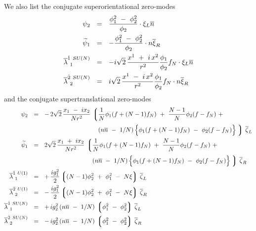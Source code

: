 \documentclass{article}
\newcommand{\wt}{\widetilde}
\newcommand{\ov}{\overline}
\newcommand{\lgr}{\left\lgroup}
\newcommand{\rgr}{\right\rgroup}
\newcommand{\nbar}{\ov{n}}
\begin{document}
We also list the conjugate superorientational zero-modes
\begin{align}
\label{n2_sorient_conj}
%
\notag
{\psi}_{2} & ~~=~~ \frac{\phi_1^2 ~-~ \phi_2^2}{\phi_2} \cdot \xi_L \nbar   \\
%
\notag
\wt{\psi}_{1}  & ~~=~~ - \frac{\phi_1^2 ~-~ \phi_2^2}{\phi_2} \cdot n \ov{\xi}_R  \\
%
\ov{\lambda}^{\dot{1}\ SU(N)}_{\ 1} & ~~=~~ - i \sqrt{2}\, \frac{ x^1 ~+~ i\, x^2 }{r^2} \frac{\phi_1}{\phi_2} f_N \cdot \xi_L \nbar \\
%
\notag
\ov{\lambda}^{\dot{2}\ SU(N)}_{\ 2} & ~~=~~  i \sqrt{2}\, \frac{ x^1 ~-~ i\, x^2 }{r^2} \frac{\phi_1}{\phi_2} f_N \cdot n \ov{\xi}_R 
\end{align}
	and the conjugate supertranslational zero-modes
\begin{align*}
%
\psi_{2}	& ~~=~~  -\,  2\sqrt{2}\, \frac{x_1 ~-~ i x_2}{N r^2} \,
		\lgr \frac{1}{N} \phi_1 ( f + (N-1) f_N ) ~+~ \frac{N-1}{N} \phi_2 ( f - f_N ) ~+~ \right.
		\\
%
			& \phantom{~~=~~  -\,  2\sqrt{2}\, \frac{x_1 ~-~ i x_2}{N r^2} \,\lgr \right.}
			\left( n\nbar ~-~ 1/N \right )
			\Bigl\{ \phi_1 ( f + ( N-1 ) f_N ) ~-~ \phi_2 ( f - f_N) \Bigr\}
		\left. \rgr\, \ov{\zeta}_L
		\\
%
\wt{\psi}_{1} & ~~=~~    2\sqrt{2} \, \frac{x_1 ~+~ i x_2}{N r^2} \,
		\lgr \frac{1}{N} \phi_1 ( f + (N-1) f_N ) ~+~ \frac{N-1}{N} \phi_2 ( f - f_N ) ~+~ \right.
		\\
%
			& \phantom{~~=~~    2\sqrt{2} \, \frac{x_1 ~+~ i x_2}{N r^2} \,\lgr \right.}
			\left( n\nbar ~-~ 1/N \right )
			\Bigl\{ \phi_1 ( f + ( N-1 ) f_N ) ~-~ \phi_2 ( f - f_N) \Bigr\}
		\left. \rgr\, \ov{\zeta}_R
		\\
%
\ov{\lambda}^{\dot{1}\ U(1)}_{\ 1} 	& ~~=~~ +\, \frac{i g_1^2}{2} \lgr (N-1)\phi_2^2  ~+~ \phi_1^2 ~-~ N\xi \rgr \, \ov{\zeta}_L 
		\\
%
\ov{\lambda}^{\dot{2}\ U(1)}_{\ 2} 	& ~~=~~ -\, \frac{i g_1^2}{2} \lgr (N-1)\phi_2^2  ~+~ \phi_1^2 ~-~ N\xi \rgr \, \ov{\zeta}_R 
		\\
%
\ov{\lambda}^{\dot{1}\ SU(N)}_{\ 1}	& ~~=~~ +\, {i g_2^2}\, ( n\nbar ~-~ 1/N )\, \lgr \phi_1^2 ~-~ \phi_2^2 \rgr\, \ov{\zeta}_L
		\\
%
\ov{\lambda}^{\dot{2}\ SU(N)}_{\ 2}	& ~~=~~ -\, {i g_2^2}\, ( n\nbar ~-~ 1/N )\, \lgr \phi_1^2 ~-~ \phi_2^2 \rgr\, \ov{\zeta}_R
\end{align*}
\end{document}
